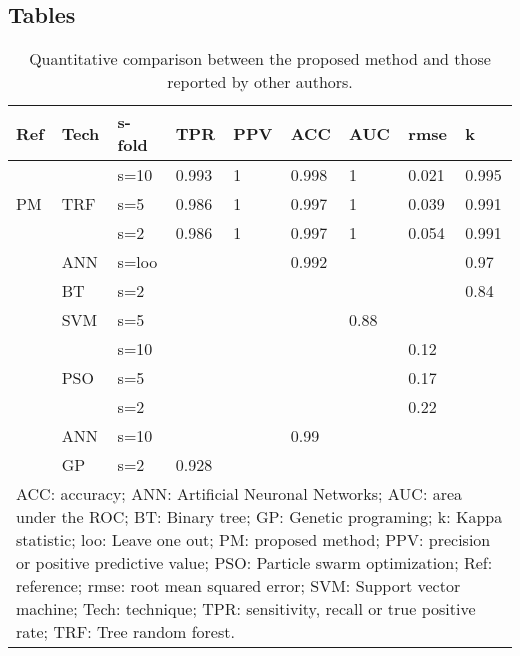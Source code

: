 \documentclass{bmcart}
\begin{document}
\begin{backmatter}
\section*{Tables}
\begin{table}[h!]
\caption{Quantitative comparison between the proposed method and those reported by other authors.}
      \begin{tabular}{ | p{0.45cm}| p{0.52cm}| p{0.65cm}| p{0.5cm}| p{0.45cm}| p{0.5cm}| p{0.4cm}| p{0.5cm} |p{0.4cm}|}%
        \hline
        Ref   	& Tech  	& s-fold   	& TPR	& PPV 	& ACC 	& AUC 	& rmse 	& k		\\ \hline 
 		\multirow{3}{*}{PM} &
 					\multirow{3}{*}{TRF} 					 			 			
 		 			 			& s=10 		& 0.993	& 1		& 0.998	& 1 	& 0.021	& 0.995	\\ 
        			& 			& s=5 		& 0.986	& 1 	& 0.997	& 1 	& 0.039	& 0.991 \\ 
        		 	&  			& s=2 		& 0.986	& 1 	& 0.997	& 1 	& 0.054	& 0.991	\\ \hline
      	\cite{6} 	 	& ANN 		& s=loo 	& 		& 	 	& 0.992	& 	 	& 		& 0.97	\\ \hline
		\cite{5} 	 	& BT 		& s=2	 	& 		& 	 	&		& 	 	& 		& 0.84	\\ \hline
		\cite{10}	 		& SVM		& s=5	 	& 		& 	 	&		& 0.88 	& 		&		\\ \hline
		\multirow{3}{*}{\cite{2}} &
 					\multirow{3}{*}{PSO}
		 	 		  			& s=10	 	& 		& 	 	&		& 	 	& 0.12	&		\\ 
			 		& 			& s=5	 	& 		& 	 	&		& 	 	& 0.17	&		\\ 
		 	 		&  			& s=2	 	& 		& 	 	&		& 	 	& 0.22	&		\\ \hline
		\cite{9}	 		& ANN		& s=10	 	&  		& 	 	& 0.99	& 	 	& 		&		\\ \hline
		\cite{3}	 		& GP		& s=2	 	& 0.928	& 	 	&		& 	 	& 		&		\\ \hline
        \multicolumn{9}{p{7.9 cm}}{ACC: accuracy; ANN: Artificial Neuronal Networks; AUC: area under the ROC; BT: Binary tree; GP: Genetic programing; k: Kappa statistic; loo: Leave one out; PM: proposed method; PPV: precision or positive predictive value; PSO: Particle swarm optimization; Ref: reference; rmse: root mean squared error; SVM: Support vector machine; Tech: technique; TPR: sensitivity, recall or true positive rate; TRF: Tree random forest.} \\ \hline
      \end{tabular}

\end{table}


\end{backmatter}
\end{document}
